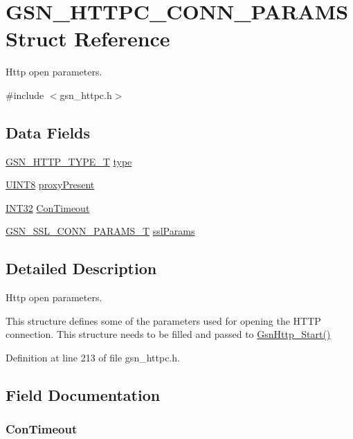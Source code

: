 \hypertarget{a00094}{
\section{GSN\_\-HTTPC\_\-CONN\_\-PARAMS Struct Reference}
\label{a00094}
}


Http open parameters.  




{\ttfamily \#include $<$gsn\_\-httpc.h$>$}

\subsection*{Data Fields}
\begin{DoxyCompactItemize}
\item 
\hyperlink{a00665_ga72317a89375e9f3d889df0439bff53ba}{GSN\_\-HTTP\_\-TYPE\_\-T} \hyperlink{a00094_aec5b5c03cb16b35ea00bfbe81a119900}{type}
\item 
\hyperlink{a00660_gab27e9918b538ce9d8ca692479b375b6a}{UINT8} \hyperlink{a00094_aa0d242f27a688c27c0f37804bb882bc9}{proxyPresent}
\item 
\hyperlink{a00660_ga63021d67d54286c2163bcdb43a6f2569}{INT32} \hyperlink{a00094_a79d8df9fbd8495814fd189aa95f51e32}{ConTimeout}
\item 
\hyperlink{a00242}{GSN\_\-SSL\_\-CONN\_\-PARAMS\_\-T} \hyperlink{a00094_ab1067c0bc67766c8d86dbef645f58430}{sslParams}
\end{DoxyCompactItemize}


\subsection{Detailed Description}
Http open parameters. 

This structure defines some of the parameters used for opening the HTTP connection. This structure needs to be filled and passed to \hyperlink{a00665_gafac7279103004f23215fe92a28ed0331}{GsnHttp\_\-Start()} 

Definition at line 213 of file gsn\_\-httpc.h.



\subsection{Field Documentation}
\hypertarget{a00094_a79d8df9fbd8495814fd189aa95f51e32}{
\subsubsection[{ConTimeout}]{ {\bf ConTimeout}}}
\label{a00094_a79d8df9fbd8495814fd189aa95f51e32}


